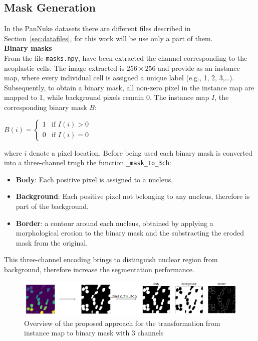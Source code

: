 \documentclass[target=bach,aauheader=,style=]{thud}
\begin{document}
\subsection{Mask Generation}
In the PanNuke datasets there are different files described in Section~\ref{sec:datafiles}, for this work will be use only a part of them.\\

\noindent\textbf{Binary masks}\\
\label{sec:maskgeneration}
From the file \texttt{masks.npy}, have been extracted the channel corresponding to the neoplastic cells. The image extracted is $256 \times 256$ and provide as an instance map, where every individual cell is assigned a unique label (e.g., 1, 2, 3,\dots). Subsequently, to obtain a binary mask, all non-zero pixel in the instance map are mapped to 1, while background pixels remain 0. The instance map $I$, the corresponding binary mask $B$:
\begin{center}
$
B(i) = 
\begin{cases}
1 & \text{if } I(i) > 0 \\
0 & \text{if } I(i) = 0
\end{cases}
$
\end{center}
where $i$ denote a pixel location. Before being used each binary mask is converted into a three-channel trugh the function \texttt{\_mask\_to\_3ch}:
\begin{itemize}
    \item \textbf{Body}: Each positive pixel is assigned to a nucleus.
    \item \textbf{Background}: Each positive pixel not belonging to any nucleus, therefore is part of the background.
    \item \textbf{Border}: a contour around each nucleus, obtained by applying a morphological erosion to the binary mask and the substracting the eroded mask from the original.
\end{itemize}
This three-channel encoding brings to distinguish nuclear region from background, therefore increase the segmentation performance.\\
\begin{figure}[H] %
    \centering
    \includegraphics[width=1\textwidth]{imgs/binarymask_transform.png}
    \caption{Overview of the proposed approach for the transformation from instance map to binary mask with 3 channels}
    \label{fig:esempio}
\end{figure}
\end{document}
